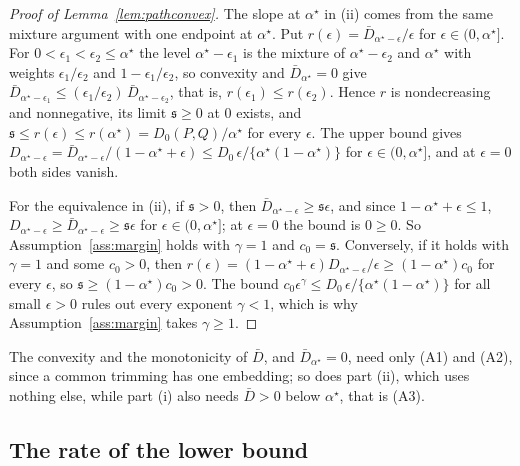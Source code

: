 \begin{proof}[Proof of Lemma~\ref{lem:pathconvex}]
The slope at $\alpha^\star$ in (ii) comes from the same mixture argument with one endpoint at $\alpha^\star$. Put $r(\epsilon)=\bar D_{\alpha^\star-\epsilon}/\epsilon$ for
$\epsilon\in(0,\alpha^\star]$. For $0<\epsilon_1<\epsilon_2\le\alpha^\star$ the level $\alpha^\star-\epsilon_1$ is the
mixture of $\alpha^\star-\epsilon_2$ and $\alpha^\star$ with weights $\epsilon_1/\epsilon_2$ and $1-\epsilon_1/\epsilon_2$,
so convexity and $\bar D_{\alpha^\star}=0$ give $\bar D_{\alpha^\star-\epsilon_1}\le(\epsilon_1/\epsilon_2)\,\bar D_{\alpha^\star-\epsilon_2}$,
that is, $r(\epsilon_1)\le r(\epsilon_2)$. Hence $r$ is nondecreasing and nonnegative, its limit $\mathfrak s\ge0$ at $0$ exists, and
$\mathfrak s\le r(\epsilon)\le r(\alpha^\star)=D_0(P,Q)/\alpha^\star$ for every $\epsilon$. The upper bound gives
$D_{\alpha^\star-\epsilon}=\bar D_{\alpha^\star-\epsilon}/(1-\alpha^\star+\epsilon)\le D_0\,\epsilon/\{\alpha^\star(1-\alpha^\star)\}$
for $\epsilon\in(0,\alpha^\star]$, and at $\epsilon=0$ both sides vanish.

For the equivalence in (ii), if $\mathfrak s>0$, then $\bar D_{\alpha^\star-\epsilon}\ge \mathfrak s\epsilon$, and since $1-\alpha^\star+\epsilon\le1$,
$D_{\alpha^\star-\epsilon}\ge \bar D_{\alpha^\star-\epsilon}\ge \mathfrak s\epsilon$ for $\epsilon\in(0,\alpha^\star]$; at $\epsilon=0$ the
bound is $0\ge0$. So Assumption~\ref{ass:margin} holds with $\gamma=1$ and $c_0=\mathfrak s$. Conversely, if it holds with
$\gamma=1$ and some $c_0>0$, then $r(\epsilon)=(1-\alpha^\star+\epsilon)D_{\alpha^\star-\epsilon}/\epsilon\ge(1-\alpha^\star)c_0$
for every $\epsilon$, so $\mathfrak s\ge(1-\alpha^\star)c_0>0$. The bound $c_0\epsilon^\gamma\le D_0\,\epsilon/\{\alpha^\star(1-\alpha^\star)\}$
for all small $\epsilon>0$ rules out every exponent $\gamma<1$, which is why Assumption~\ref{ass:margin} takes
$\gamma\ge1$.
\end{proof}

The convexity and the monotonicity of $\bar D$, and $\bar D_{\alpha^\star}=0$, need only (A1) and (A2), since a
common trimming has one embedding; so does part (ii), which uses nothing else, while part (i) also needs
$\bar D>0$ below $\alpha^\star$, that is (A3).

\subsection{The rate of the lower bound}
\label{sec:lorate}

